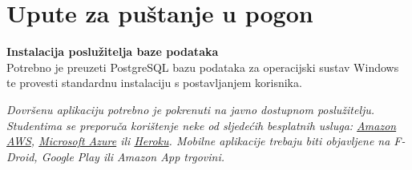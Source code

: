 			\eject 
		
		\section{Upute za puštanje u pogon}
		
			\textbf{Instalacija poslužitelja baze podataka}\\

			Potrebno je preuzeti PostgreSQL bazu podataka za operacijski sustav Windows te provesti standardnu instalaciju s postavljanjem korisnika.
			
			
			 \textit{Dovršenu aplikaciju potrebno je pokrenuti na javno dostupnom poslužitelju. Studentima se preporuča korištenje neke od sljedećih besplatnih usluga: \href{https://aws.amazon.com/}{Amazon AWS}, \href{https://azure.microsoft.com/en-us/}{Microsoft Azure} ili \href{https://www.heroku.com/}{Heroku}. Mobilne aplikacije trebaju biti objavljene na F-Droid, Google Play ili Amazon App trgovini.}
			
			
			\eject 